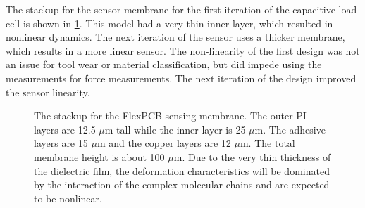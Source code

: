 The stackup for the sensor membrane for the first iteration of the capacitive load cell
is shown in \ref{fig:stackupsense}. This model had a very thin inner layer, which resulted
in nonlinear dynamics. The next iteration of the sensor uses a thicker membrane,
which results in a more linear sensor. 
The non-linearity of the first design was not an issue for tool wear or material classification,
but did impede using the measurements for force measurements. 
The next iteration of the design improved the sensor linearity.

\begin{figure}[t]
\centering
{}
\caption{The stackup for the FlexPCB sensing membrane. The outer PI layers are 12.5 $\mu$m
tall while the inner layer is 25 $\mu$m. The adhesive layers are 15 $\mu$m and the copper
layers are 12 $\mu$m. The total membrane height is about 100 $\mu$m. Due to the very thin
thickness of the dielectric film, the deformation characteristics will be dominated
by the interaction of the complex molecular chains and are expected to be nonlinear.
}
\label{fig:stackupsense}
\end{figure}

